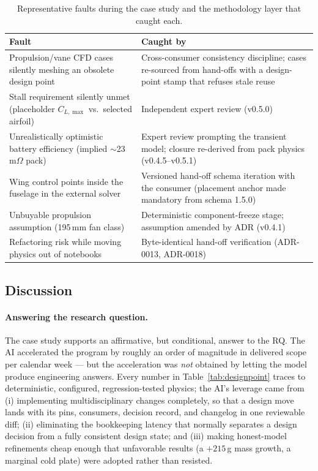 \begin{table}[htbp]
\centering
\caption{Representative faults during the case study and the
methodology layer that caught each.}
\label{tab:errors}
\small
\begin{tabularx}{\textwidth}{@{}XX@{}}
\toprule
\textbf{Fault} & \textbf{Caught by} \\
\midrule
Propulsion/vane CFD cases silently meshing an obsolete design point &
Cross-consumer consistency discipline; cases re-sourced from hand-offs
with a design-point stamp that refuses stale reuse \\
\addlinespace
Stall requirement silently unmet (placeholder $C_{L,\max}$ vs.\
selected airfoil) & Independent expert review (v0.5.0) \\
\addlinespace
Unrealistically optimistic battery efficiency (implied
$\sim$23\,m$\Omega$ pack) & Expert review prompting the transient
model; closure re-derived from pack physics (v0.4.5--v0.5.1) \\
\addlinespace
Wing control points inside the fuselage in the external solver &
Versioned hand-off schema iteration with the consumer (placement
anchor made mandatory from schema 1.5.0) \\
\addlinespace
Unbuyable propulsion assumption (195\,mm fan class) & Deterministic
component-freeze stage; assumption amended by ADR (v0.4.1) \\
\addlinespace
Refactoring risk while moving physics out of notebooks &
Byte-identical hand-off verification (ADR-0013, ADR-0018) \\
\bottomrule
\end{tabularx}
\end{table}

\subsection{Discussion}
\label{sec:discussion}

\paragraph{Answering the research question.} The case study supports
an affirmative, but conditional, answer to the RQ. The AI accelerated
the program by roughly an order of magnitude in delivered scope per
calendar week --- but the acceleration was \emph{not} obtained by
letting the model produce engineering answers. Every number in
Table~\ref{tab:designpoint} traces to deterministic, configured,
regression-tested physics; the AI's leverage came from (i)
implementing multidisciplinary changes completely, so that a design
move lands with its pins, consumers, decision record, and changelog in
one reviewable diff; (ii) eliminating the bookkeeping latency that
normally separates a design decision from a fully consistent design
state; and (iii) making honest-model refinements cheap enough that
unfavorable results (a $+215$\,g mass growth, a marginal cold plate)
were adopted rather than resisted.

